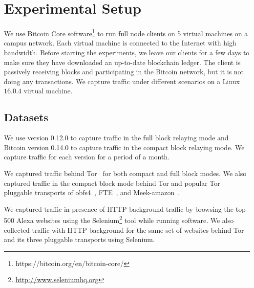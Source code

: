 \section{Experimental Setup}\label{sec:exp-dataset}

We use Bitcoin Core software\footnote{https://bitcoin.org/en/bitcoin-core/} to run full node \bc clients on 5 virtual machines on a campus network. Each virtual machine is connected to the Internet with high bandwidth. Before starting the experiments, we leave our \bc clients for a few days to make sure they have downloaded an up-to-date blockchain ledger. The \bc client is passively receiving blocks and participating in the Bitcoin network, but it is not doing any transactions.
We capture \bc traffic under  different scenarios on a Linux $16.0.4$ virtual machine. 
\subsection{Datasets}
 We use \bc version 0.12.0 to capture \bc traffic in the full block relaying mode and Bitcoin version 0.14.0 to capture traffic in the compact block relaying mode. We capture \bc traffic for each version for a period of a month.

 We captured \bc traffic behind Tor~\cite{tor} for both compact and full block modes.
We also captured \bc traffic in the compact block mode behind %
Tor and popular Tor pluggable transports of obfs4~\cite{obfs4}, FTE~\cite{fte}, and Meek-amazon~\cite{meek}.

 We captured \bc traffic in presence of HTTP background traffic by browsing the top 500 Alexa websites using the Selenium\footnote{\url{http://www.seleniumhq.org}} tool while running \bc software. We also collected \bc 
traffic with HTTP background for the same set of websites behind Tor and its three pluggable transports using Selenium.

